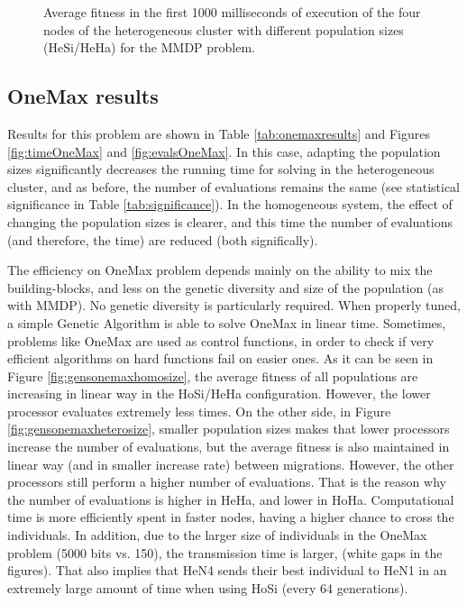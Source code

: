 \begin{figure*}
\centering
{} %
\caption{Average fitness in the first 1000 milliseconds of execution of the four nodes of the heterogeneous cluster with different population sizes (HeSi/HeHa) for the MMDP problem.}
\label{fig:hesiheha}
\end{figure*}



\subsection{OneMax results}

Results for this problem are shown in Table \ref{tab:onemaxresults} and Figures  \ref{fig:timeOneMax} and \ref{fig:evalsOneMax}. In this case, adapting the population sizes significantly decreases  the running time for solving in the heterogeneous cluster, and as before, the number of evaluations remains the same (see statistical significance in Table \ref{tab:significance}). In the homogeneous system, the effect of changing the population sizes is clearer, and this time the number of evaluations (and therefore, the time) are reduced (both significally). 

The efficiency on OneMax problem depends mainly on the ability to mix the building-blocks, and less on the genetic diversity and size of the population (as with MMDP). No genetic diversity is particularly required. When properly tuned, a simple Genetic Algorithm is able to solve OneMax in linear time. Sometimes, problems like OneMax are used as control functions, in order to check if very efficient algorithms on hard functions fail on easier ones. As it can be seen in Figure \ref{fig:gensonemaxhomosize}, the average fitness of all populations are increasing in linear way in the HoSi/HeHa configuration. However, the lower processor evaluates extremely less times.  On the other side, in Figure \ref{fig:gensonemaxheterosize}, smaller population sizes makes that lower processors increase the number of evaluations, but the average fitness is also maintained in linear way (and in smaller increase rate) between migrations. However, the other processors  still perform a higher number of evaluations. That is the reason why the number of evaluations is higher in HeHa, and lower in HoHa. Computational time is more efficiently spent in faster nodes, having a higher chance to cross the individuals. In addition, due to the larger size of  individuals in the OneMax problem (5000 bits vs. 150), the transmission time is larger, (white gaps in the figures). That also implies that HeN4 sends their best individual to HeN1 in an extremely large amount of time when using HoSi (every 64 generations).

